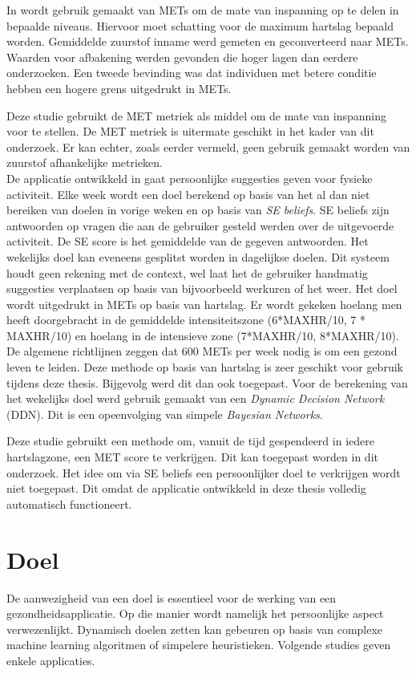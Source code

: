 In \citep{ref19} wordt gebruik gemaakt van METs om de mate van inspanning op te delen in bepaalde niveaus. Hiervoor moet schatting voor de maximum hartslag bepaald worden. 
Gemiddelde zuurstof inname werd gemeten en geconverteerd naar METs. Waarden voor afbakening werden gevonden die hoger lagen dan eerdere onderzoeken. Een tweede bevinding was dat individuen met betere conditie hebben een hogere grens uitgedrukt in METs.

Deze studie gebruikt de MET metriek als middel om de mate van inspanning voor te stellen. De MET metriek is uitermate geschikt in het kader van dit onderzoek. Er kan echter, zoals eerder vermeld, geen gebruik gemaakt worden van zuurstof afhankelijke metrieken. \\

De applicatie ontwikkeld in \citep{ref21} gaat persoonlijke suggesties geven voor fysieke activiteit. Elke week wordt een doel berekend op basis van het al dan niet bereiken van doelen in vorige weken en op basis van \textit{SE beliefs}. SE beliefs zijn antwoorden op vragen die aan de gebruiker gesteld werden over de uitgevoerde activiteit. De SE score is het gemiddelde van de gegeven antwoorden. Het wekelijks doel kan eveneens gesplitst worden in dagelijkse doelen. Dit systeem houdt geen rekening met de context, wel laat het de gebruiker handmatig suggesties verplaatsen op basis van bijvoorbeeld werkuren of het weer. Het doel wordt uitgedrukt in METs op basis van hartslag. Er wordt gekeken hoelang men heeft doorgebracht in de gemiddelde intensiteitszone (6*MAXHR/10, 7 * MAXHR/10) en hoelang in de intensieve zone (7*MAXHR/10, 8*MAXHR/10).  De algemene richtlijnen zeggen dat 600 METs per week nodig is om een gezond leven te leiden. Deze methode op basis van hartslag is zeer geschikt voor gebruik tijdens deze thesis. Bijgevolg werd dit dan ook toegepast.
Voor de berekening van het wekelijks doel werd gebruik gemaakt van een \textit{Dynamic Decision Network} (DDN). Dit is een opeenvolging van simpele \textit{Bayesian Networks}. 

Deze studie gebruikt een methode om, vanuit de tijd gespendeerd in iedere hartslagzone, een MET score te verkrijgen. Dit kan toegepast worden in dit onderzoek. Het idee om via SE beliefs een persoonlijker doel te verkrijgen wordt niet toegepast. Dit omdat de applicatie ontwikkeld in deze thesis volledig automatisch functioneert.

\section{Doel}
De aanwezigheid van een doel is essentieel voor de werking van een gezondheidsapplicatie. Op die manier wordt namelijk het persoonlijke aspect verwezenlijkt.
Dynamisch doelen zetten kan gebeuren op basis van complexe machine learning algoritmen of simpelere heuristieken. Volgende studies geven enkele applicaties.\\

